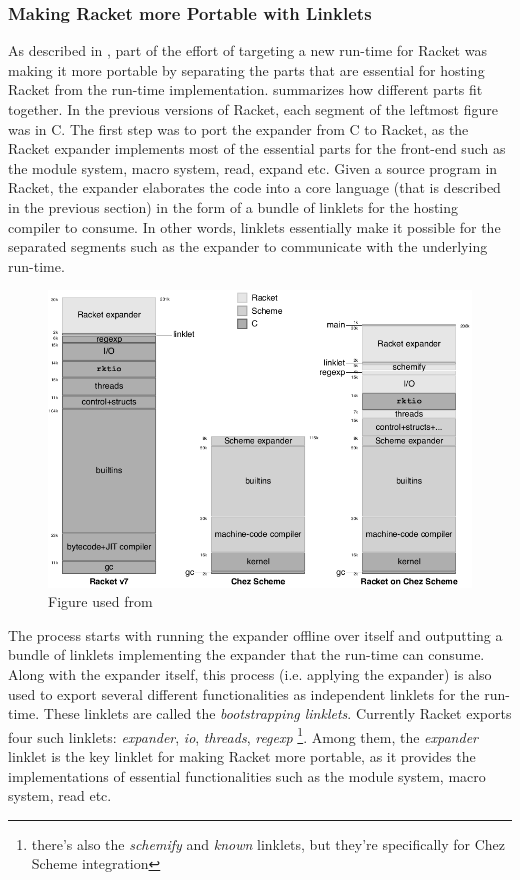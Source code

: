 \newpage

\subsubsection{Making Racket more Portable with Linklets}
\label{subsec:racket-portable}

As described in , part of the effort of targeting a
new run-time for Racket was making it more portable by separating the
parts that are essential for hosting Racket from the run-time
implementation.  summarizes how different
parts fit together. In the previous versions of Racket, each segment
of the leftmost figure was in C. The first step was to port the
expander from C to Racket, as the Racket expander implements most of
the essential parts for the front-end such as the module system, macro
system, read, expand etc. Given a source program in Racket, the
expander elaborates the code into a core language (that is described
in the previous section) in the form of a bundle of linklets for the
hosting compiler to consume. In other words, linklets essentially make
it possible for the separated segments such as the expander to
communicate with the underlying run-time.

\begin{figure}[h]
  \centering
  \includegraphics[scale=0.3]{img/racket-portable}
  \caption{Figure used from \cite{racket-on-chez-19}}
  \label{fig:racket-portable}
\end{figure}

The process starts with running the expander offline over itself and
outputting a bundle of linklets implementing the expander that the
run-time can consume. Along with the expander itself, this process
(i.e. applying the expander) is also used to export several different
functionalities as independent linklets for the run-time. These
linklets are called the \emph{bootstrapping linklets}. Currently
Racket exports four such linklets: \emph{expander}, \emph{io},
\emph{threads}, \emph{regexp} \footnote{there's also the
  \emph{schemify} and \emph{known} linklets, but they're specifically
  for Chez Scheme integration}. Among them, the \emph{expander}
linklet is the key linklet for making Racket more portable, as it
provides the implementations of essential functionalities such as the
module system, macro system, read etc.

